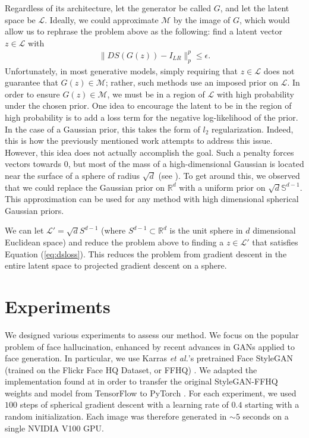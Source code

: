 \documentclass[10pt,twocolumn,letterpaper]{article}
\begin{document}
Regardless of its architecture, let the generator be called $G$, and let the latent space be $\mathcal{L}$. Ideally,  we could approximate $\mathcal{M}$ by the image of $G$, which would allow us to rephrase the problem above as the following: find a latent vector $z \in \mathcal{L}$ with 
\begin{align}
\label{eq:dsloss}
    \|DS(G(z))-I_{LR}\|_p^p \leq \epsilon.
\end{align} 
Unfortunately, in most generative models, simply requiring that $z \in \mathcal{L}$ does not guarantee that $G(z) \in \mathcal{M}$; rather, such methods use an imposed prior on $\mathcal{L}$. In order to ensure $G(z) \in \mathcal{M}$, we must be in a region of $\mathcal{L}$ with high probability under the chosen prior. One idea to encourage the latent to be in the region of high probability is to add a loss term for the negative log-likelihood of the prior. In the case of a Gaussian prior, this takes the form of $l_2$ regularization. Indeed, this is how the previously mentioned work \cite{bora2017compressed} attempts to address this issue. However, this idea does not actually accomplish the goal. Such a penalty forces vectors towards $0$, but most of the mass of a high-dimensional Gaussian is located near the surface of a sphere of radius $\sqrt{d}$ (see \cite{vershynin_2018}). To get around this, we observed that we could replace the Gaussian prior on $\mathbb{R}^{d}$ with a uniform prior on $\sqrt{d}\mathbb{S}^{d-1}$. This approximation can be used for any method with high dimensional spherical Gaussian priors.


We can let $\mathcal{L}'=\sqrt{d}S^{d-1}$ (where $S^{d-1} \subset \mathbb{R}^{d}$ is the unit sphere in $d$ dimensional Euclidean space) and reduce the problem above to finding a $z \in \mathcal{L}'$ that satisfies Equation (\ref{eq:dsloss}). This reduces the problem from gradient descent in the entire latent space to projected gradient descent on a sphere.

\section{Experiments}

We designed various experiments to assess our method. We focus on the popular problem of face hallucination, enhanced by recent advances in GANs applied to face generation. In particular, we use Karras \textit{et al.}'s pretrained Face StyleGAN (trained on the Flickr Face HQ Dataset, or FFHQ) \cite{karras2019style}. We adapted the implementation found at \cite{PyTorchStyleGAN} in order to transfer the original StyleGAN-FFHQ weights and model from TensorFlow \cite{abadi2016tensorflow} to PyTorch \cite{paszke2019pytorch}. For each experiment, we used $100$ steps of spherical gradient descent with a learning rate of $0.4$ starting with a random initialization. Each image was therefore generated in ${\sim}5$ seconds on a single NVIDIA V100 GPU. 
\end{document}
